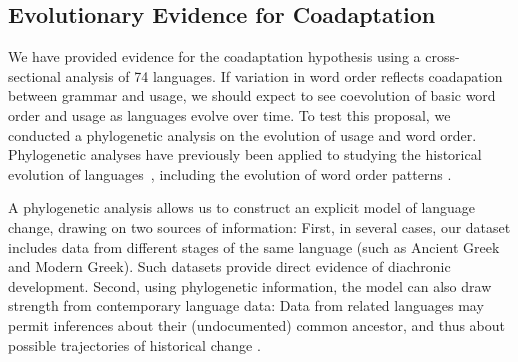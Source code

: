 \documentclass[11pt,a4paper]{article}
\begin{document}


\subsection*{Evolutionary Evidence for Coadaptation}
We have provided evidence for the coadaptation hypothesis using a cross-sectional analysis of 74 languages. %
If variation in word order reflects coadapation between grammar and usage, we should expect to see coevolution of basic word order and usage as languages evolve over time.
To test this proposal, we conducted a phylogenetic analysis on the evolution of usage and word order.
Phylogenetic analyses have previously been applied to studying the historical evolution of languages~\citep[e.g., ][]{gray2009language,greenhill2009austronesian,chang2015ancestry,sagart2019dated}, including the evolution of word order patterns \citep{dunn-evolved-2011, maurits2014tracing}.


A phylogenetic analysis allows us to construct an explicit model of language change, drawing on two sources of information:
First, in several cases, our dataset includes data from different stages of the same language (such as Ancient Greek and Modern Greek).
Such datasets provide direct evidence of diachronic development.
Second, using phylogenetic information, the model can also draw strength from contemporary language data:
Data from related languages may permit inferences about their (undocumented) common ancestor, and thus about possible trajectories of historical change \citep{pagel2004bayesian, dunn-evolved-2011, maurits2014tracing}.
\end{document}
